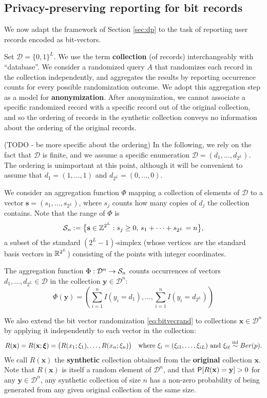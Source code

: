 \documentclass[11pt,draft]{article}
\newcommand{\Dsp}{\mathcal{D}}
\newcommand{\Ssp}{\mathcal{S}}
\newcommand{\xv}{\mathbf{x}}
\newcommand{\yv}{\mathbf{y}}
\newcommand{\sv}{\mathbf{s}}
\begin{document}
\subsection{Privacy-preserving reporting for bit records}

We now adapt the framework of Section \ref{sec:dp} to the task of reporting
user records encoded as bit-vectors.

Set $\Dsp = \{0,1\}^L$. We use the term \textbf{collection} (of records) interchangeably with ``database''.
We consider a randomized query $A$ that randomizes each record in the collection independently, and aggregates the results by reporting occurrence counts for every possible randomization outcome.
We adopt this aggregation step as a model for \textbf{anonymization}.
After anonymization, we cannot associate a specific randomized record with
a specific record out of the original collection, and so the ordering of
records in the synthetic collection conveys no information about the ordering
of the original records.

(TODO - be more specific about the ordering)
In the following, we rely on the fact that $\Dsp$ is finite, and we assume a specific enumeration $\Dsp = (d_1,\dots,d_{2^L})$. The ordering is unimportant at this point, although it will be convenient to assume that $d_1 =  (1,\dots,1)$ and $d_{2^L} = (0,\dots,0)$.

We consider an aggregation function $\Phi$ mapping a collection of elements of
$\Dsp$ to a vector $\sv = (s_1,\dots,s_{2^L})$, where $s_j$ counts how
many copies of $d_j$ the collection contains.
Note that the range of $\Phi$ is
\[ \Ssp_n := \big\{ \sv \in \Z^{2^L}: s_j \geq 0,\,
s_1 +\cdots + s_{2^L} = n\big\}, \]
a subset of the standard $(2^L-1)$-simplex (whose vertices are the standard
basis vectors in $\mathbb{R}^{2^L}$) consisting of the points with integer coordinates.

\begin{defn}
The aggregation function $\map{\Phi}{\Dsp^n}{\Ssp_n}$ counts occurrences of
vectors $d_1,\dots, d_{2^L} \in \Dsp$ in the collection $\yv \in \Dsp^n$:
\[ \Phi(\yv) = \left(\sum_{i = 1}^n I(y_i = d_1),\dots,
\sum_{i = 1}^n I(y_i = d_{2^L}) \right)
\]
\end{defn}

We also extend the bit vector randomization \eqref{eq:bitvecrand} to
collections $\xv\in\Dsp^n$ by applying it independently to each vector in the
collection:
\[ R(\xv) = R(\xv;\boldsymbol{\xi})
= \big(R(x_1;\xi_1),\dots,R(x_n; \xi_n)\big)
\quad\text{where } \xi_i = (\xi_{i1},\dots,\xi_{iL}) \text{ and }
\xi_{i\ell} \iid Ber(p). \]
We call $R(\xv)$ the \textbf{synthetic} collection obtained from the
\textbf{original} collection $\xv$.
Note that $R(\xv)$ is itself a random element of $\Dsp^n$, and that
$\P[R(\xv) = \yv] > 0$ for any $\yv\in\Dsp^n$, \ie any synthetic collection of
size $n$ has a non-zero probability of being generated from any given original
collection of the same size.
\end{document}

